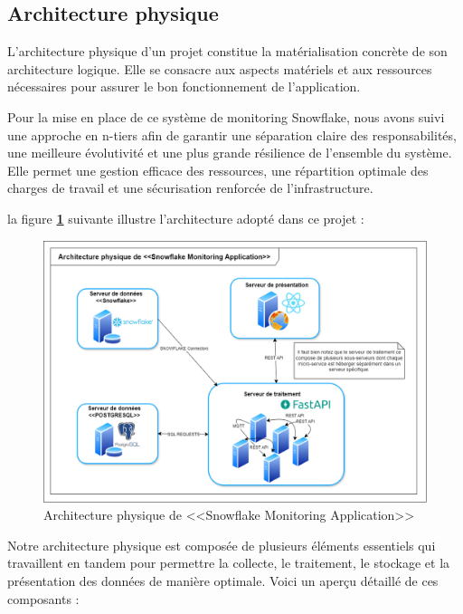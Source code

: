 \subsection{Architecture physique}
    \par L'architecture physique d'un projet constitue la matérialisation concrète de son architecture logique. Elle se consacre aux aspects matériels et aux ressources nécessaires pour assurer le bon fonctionnement de l'application\cite{archi_phy}.
    \par Pour la mise en place de ce système de monitoring Snowflake, nous avons suivi une approche en n-tiers afin de garantir une séparation claire des responsabilités, 
    une meilleure évolutivité et une plus grande résilience de l'ensemble du système. Elle permet une gestion efficace des ressources, une répartition optimale des charges de travail et une sécurisation renforcée de l'infrastructure. 
    \par la figure \textbf{\ref{fig:arch_phy}} suivante illustre l'architecture adopté dans ce projet : 
        \begin{figure}[H]
        \centering
        \includegraphics[width = 17cm ]{img/conception/archi_phy.png}
        \caption{Architecture physique de <<Snowflake Monitoring Application>>}
        \label{fig:arch_phy}
        \end{figure}
        \par Notre architecture physique est composée de plusieurs éléments essentiels qui travaillent en tandem pour permettre la collecte, le traitement, le stockage et la présentation des données de manière optimale. Voici un aperçu détaillé de ces composants :
